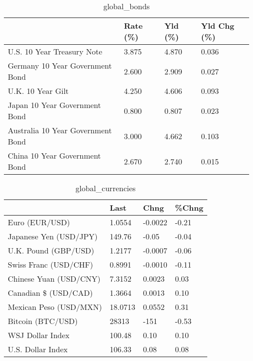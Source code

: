 \documentclass{article}%
\begin{document}
%


\begin{table}[htbp]%
\caption{global\_bonds}%
\centering%
\begin{adjustbox}{width=1\textwidth}%
\begin{tabular}{llll}
\toprule
                                  & Rate (\%) & Yld (\%) & Yld Chg (\%) \\
\midrule
       U.S. 10 Year Treasury Note &    3.875 &   4.870 &       0.036 \\
  Germany 10 Year Government Bond &    2.600 &   2.909 &       0.027 \\
                U.K. 10 Year Gilt &    4.250 &   4.606 &       0.093 \\
    Japan 10 Year Government Bond &    0.800 &   0.807 &       0.023 \\
Australia 10 Year Government Bond &    3.000 &   4.662 &       0.103 \\
    China 10 Year Government Bond &    2.670 &   2.740 &       0.015 \\
\bottomrule
\end{tabular}
%
\end{adjustbox}%
\end{table}

%


\begin{table}[htbp]%
\caption{global\_currencies}%
\centering%
\begin{adjustbox}{width=1\textwidth}%
\begin{tabular}{llll}
\toprule
                       &    Last &    Chng & \%Chng \\
\midrule
        Euro (EUR/USD) &  1.0554 & -0.0022 & -0.21 \\
Japanese Yen (USD/JPY) &  149.76 &   -0.05 & -0.04 \\
  U.K. Pound (GBP/USD) &  1.2177 & -0.0007 & -0.06 \\
 Swiss Franc (USD/CHF) &  0.8991 & -0.0010 & -0.11 \\
Chinese Yuan (USD/CNY) &  7.3152 &  0.0023 &  0.03 \\
  Canadian \$ (USD/CAD) &  1.3664 &  0.0013 &  0.10 \\
Mexican Peso (USD/MXN) & 18.0713 &  0.0552 &  0.31 \\
     Bitcoin (BTC/USD) &   28313 &    -151 & -0.53 \\
      WSJ Dollar Index &  100.48 &    0.10 &  0.10 \\
     U.S. Dollar Index &  106.33 &    0.08 &  0.08 \\
\bottomrule
\end{tabular}
%
\end{adjustbox}%
\end{table}
\end{document}
